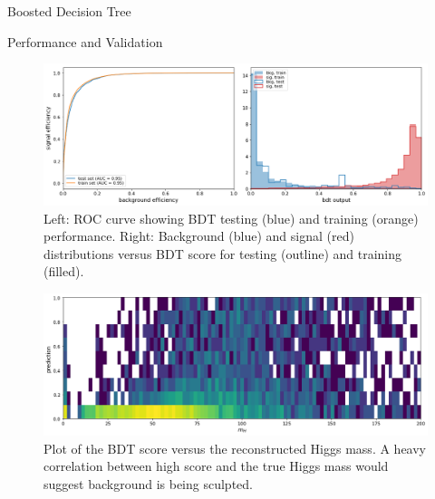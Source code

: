 \begin{section}{Boosted Decision Tree}
\begin{subsection}{Performance and Validation}
\begin{figure}[htb]
\begin{center}
\includegraphics[width=.95\linewidth]{Dissertation/fig/bdt-performance.png}
\end{center}
\caption{Left: ROC curve showing BDT testing (blue) and training (orange) performance. Right: Background (blue) and signal (red) distributions versus BDT score for testing (outline) and training (filled).}
\label{fig:bdt-performance}
\end{figure}

\begin{figure}[htb]
\begin{center}
\includegraphics[width=.95\linewidth]{Dissertation/fig/bdt-bkgsculpt1.png}
\end{center}
\caption{Plot of the BDT score versus the reconstructed Higgs mass. A heavy correlation between high score and the true Higgs mass would suggest background is being sculpted.}
\label{fig:bdt-bkgsculpt1}
\end{figure}


\end{subsection}
\end{section}
